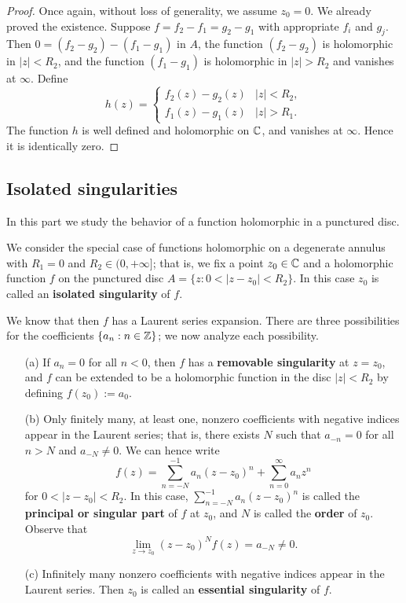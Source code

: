 \begin{proof}
Once again, without loss of generality, we assume $z_0=0$. We already proved the existence. Suppose $f=f_2-f_1=g_2-g_1$ with appropriate $f_i$ and $g_j$. Then $0=(f_2-g_2)-(f_1-g_1)$ in $A$, the function $(f_2-g_2)$ is holomorphic in $|z|<R_2$, and the function $(f_1-g_1)$ is holomorphic in $|z|>R_2$ and vanishes at $\infty$. Define
\[h(z)=\begin{cases}
f_2(z)-g_2(z)&|z|<R_2,\\
f_1(z)-g_1(z)&|z|>R_1.
\end{cases}\]
The function $h$ is well defined and holomorphic on $\mathbb{C}$, and vanishes at $\infty$. Hence it is identically zero.
\end{proof}
\subsection{Isolated singularities}
In this part we study the behavior of a function holomorphic in a punctured disc.
\begin{definition}
We consider the special case of functions holomorphic on a degenerate annulus with $R_1=0$ and $R_2\in(0,+\infty]$; that is, we fix a point $z_0\in\mathbb{C}$ and a holomorphic function $f$ on the punctured disc $A=\{z:0<|z-z_0|<R_2\}$. In this case $z_0$ is called an \textbf{isolated singularity} of $f$.
\end{definition}
We know that then $f$ has a Laurent series expansion. There are three possibilities for the coefficients $\{a_n:n\in\mathbb{Z}\}$; we now analyze each possibility.
\begin{itemize}
\item[(a)] If $a_n=0$ for all $n<0$, then $f$ has a \textbf{removable singularity} at $z=z_0$, and $f$ can be extended to be a holomorphic function in the disc $|z|<R_2$ by defining $f(z_0):=a_0$.
\item[(b)] Only finitely many, at least one, nonzero coefficients with negative indices appear in the Laurent series; that is, there exists $N$ such that $a_{-n}=0$ for all $n>N$ and $a_{-N}\neq 0$. We can hence write
\[f(z)=\sum_{n=-N}^{-1}a_n(z-z_0)^n+\sum_{n=0}^{\infty}a_nz^n\]
for $0<|z-z_0|<R_2$. In this case, $\sum_{n=-N}^{-1}a_n(z-z_0)^n$ is called the \textbf{principal or singular part} of $f$ at $z_0$, and $N$ is called the \textbf{order} of $z_0$. Observe that
\[\lim_{z\to z_0}(z-z_0)^Nf(z)=a_{-N}\neq 0.\]
\item[(c)] Infinitely many nonzero coefficients with negative indices appear in the Laurent series. Then $z_0$ is called an \textbf{essential singularity} of $f$.
\end{itemize}
